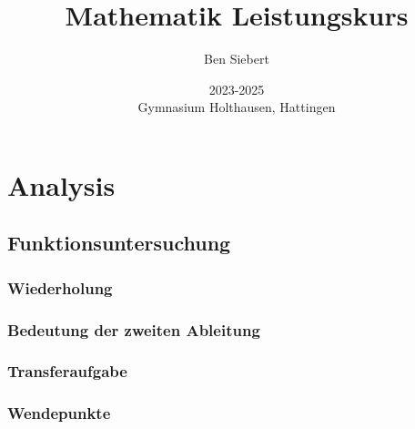 \documentclass[a4paper,12pt]{report}
\begin{document}
    \bsremovechaptertitle
    \bsremoveparttitle

    \title{Mathematik Leistungskurs}
    \date{
        2023-2025
        \\
        Gymnasium Holthausen, Hattingen
    }
    \author{Ben Siebert}
    \maketitle

    \tableofcontents


    \part{Analysis}


    \chapter{Funktionsuntersuchung}


    \section{Wiederholung}
    


    \section{Bedeutung der zweiten Ableitung}
    
    \section{Transferaufgabe}
    
    \newpage
    \section{Wendepunkte}
    
\end{document}
